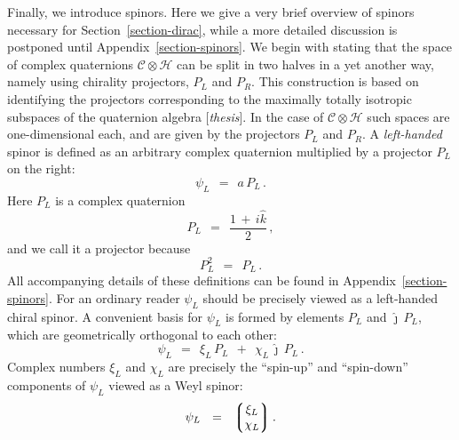 \documentclass[epsfig,12pt]{article}
\newcommand{\jj}{\hat\jmath}
\newcommand{\kk}{\hat k}
\newcommand{\cc}{\mathcal{C}}
\newcommand{\ch}{\mathcal{H}}
\begin{document}
	Finally, we introduce spinors.
	Here we give a very brief overview of spinors necessary for Section~\ref{section-dirac}, while
	a more detailed discussion is postponed until Appendix~\ref{section-spinors}.
	We begin with stating that the space of complex quaternions $ \cc \otimes \ch $
	can be split in two halves in a yet another way, namely using chirality projectors, $ P_L $ and $ P_R $.
	This construction is based on identifying the projectors corresponding to the
	maximally totally isotropic subspaces of the quaternion algebra [\emph{thesis}].
	In the case of $ \cc \otimes \ch $ such spaces are one-dimensional each, and are given
	by the projectors $ P_L $ and $ P_R $.
	A \emph{left-handed} spinor is defined as an arbitrary complex quaternion multiplied by 
	a projector $ P_L $ on the right:
\begin{equation}
	\psi_L	~~=~~	a\,P_L\,.
\end{equation}
	Here $ P_L $ is a complex quaternion
\begin{equation}
	P_L	~~=~~	\frac{1 \,+\, i\kk} 2\,,
\end{equation}
	and we call it a projector because
\[
	P_L^2	~~=~~	P_L\,.
\]
	All accompanying details of these definitions can be found in Appendix~\ref{section-spinors}.
	For an ordinary reader $ \psi_L $ should be precisely viewed as a left-handed
	chiral spinor.
	A convenient basis for $ \psi_L $ is formed by elements $ P_L $ and $ \jj\,P_L $,
	which are geometrically orthogonal to each other:
\begin{equation}
\label{lbasis}
	\psi_L	~~=~~	\xi_L\,P_L  ~~+~~  \chi_L\,\jj\,P_L\,.
\end{equation}
	Complex numbers $ \xi_L $ and $ \chi_L $ are precisely the ``spin-up'' and ``spin-down''
	components of $ \psi_L $ viewed as a Weyl spinor:
\begin{equation}
	\psi_L	~~=~~	\left\lgroup
				\begin{matrix}
					\xi_L \\
					\chi_L
                		\end{matrix}
			\right\rgroup.
\end{equation}
\end{document}
